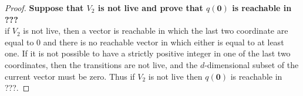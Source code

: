 \begin{proof}
{\bf Suppose that $V_2$ is not live and prove that 
$q(\textbf{0})$ is reachable in ???}\\

if $V_2$ is not live, then a vector  is reachable in which the last two coordinate are equal to $0$ and there is no reachable vector in which either is equal to at least one.
If it is not possible to have a strictly positive integer in one of the last two coordinates, then the transitions  are not live, and the
$d$-dimensional subset 
of the current vector must be zero.
Thus if $V_2$ is not live then 
$q(\textbf{0})$ is reachable in ???.
\end{proof}








